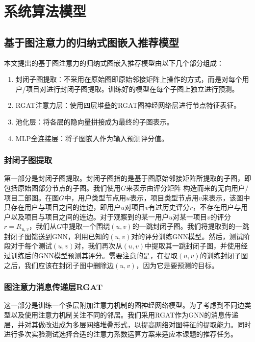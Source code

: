 \documentclass{ctexart}
\begin{document}
\section{系统算法模型}

\subsection{基于图注意力的归纳式图嵌入推荐模型}

本文提出的基于图注意力的归纳式图嵌入推荐模型由以下几个部分组成：
\begin{enumerate}
    \item 封闭子图提取：不采用在原始图即原始邻接矩阵上操作的方式，而是对每个用户/项目对进行封闭子图提取。训练好的模型在每个子图上独立进行预测。
    \item RGAT注意力层：使用四层堆叠的RGAT图神经网络层进行节点特征表征。
    \item 池化层：将各层的隐向量拼接成为最终的子图表示。
    \item MLP全连接层：将子图嵌入作为输入预测评分值。
\end{enumerate}

\subsubsection{封闭子图提取}
第一部分是封闭子图提取。封闭子图指的是基于图原始邻接矩阵所提取的子图，即包括原始图部分节点的子图。我们使用$G$来表示由评分矩阵 构造而来的无向用户/项目二部图。在图$G$中，用户类型节点用$u$表示，项目类型节点用$v$来表示，该图中只存在用户与项目之间的连边，即用户$u$对项目$v$有过历史评分$r$，不存在用户与用户以及项目与项目之间的连边。对于观察到的某一用户$u$对某一项目$v$的评分$r=R_{u,v}$，我们从$G$中提取一个围绕$(u,v)$的一跳封闭子图。我们将提取到的一跳封闭子图馈送到GNN，利用已知的$(u,v)$对的评分训练GNN模型。然后，测试阶段对于每个测试$(u,v)$对，我们再次从$(u,v)$中提取其一跳封闭子图，并使用经过训练后的GNN模型预测其评分。需要注意的是，在提取$(u,v)$的训练封闭子图之后，我们应该在封闭子图中删除边$(u,v)$，因为它是要预测的目标。

\subsubsection{图注意力消息传递层RGAT}
这一部分是训练一个多层附加注意力机制的图神经网络模型。为了考虑到不同边类型以及使用注意力机制关注不同的邻居。我们采用RGAT作为GNN的消息传递层，并对其做改进成为多层网络堆叠形式，以提高网络对图特征的提取能力。同时进行多次实验测试选择合适的注意力系数运算方案来适应本课题的推荐任务。
\end{document}
